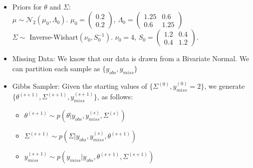 \documentclass{article}
\begin{document}
\\
\begin{itemize}
\item Priors for $\theta$ and $\Sigma:$\\
$\mu \sim \mathcal{N}_2\left(\mu_0,\Lambda_0\right).$ $\mu_0 = \left(\begin{matrix}0.2\\0.2\end{matrix}\right)$, $\Lambda_0 = \left(\begin{matrix}1.25 & 0.6\\0.6 & 1.25\end{matrix}\right)$\\
$\Sigma \sim$ Inverse-Wishart$\left(\nu_0,S_0^{-1}\right).$ $\nu_0 = 4$, $S_0 = \left(\begin{matrix}1.2 & 0.4\\0.4 & 1.2\end{matrix}\right).$

\item Missing Data: We know that our data is drawn from a Bivariate Normal. We can partition each sample as $\{y_{obs},y_{miss}\}$

\item Gibbs Sampler: Given the starting values of $\{\Sigma^{(0)},y_{miss}^{(0)}=2\}$, we generate $\{\theta^{(s+1)},\Sigma^{(s+1)},y_{miss}^{(s+1)}\}$, as follows:
\begin{itemize}
\item $\theta^{(s+1)} \sim p(\theta|y_{obs},y_{miss}^{(s)},\Sigma^{(s)})$
\item $\Sigma^{(s+1)} \sim p(\Sigma|y_{obs},y_{miss}^{(s)},\theta^{(s+1)})$
\item $y_{miss}^{(s+1)} \sim p(y_{miss}|y_{obs},\theta^{(s+1)},\Sigma^{(s+1)})$\\
\end{itemize}

\pagebreak


\end{itemize}
\end{document}
